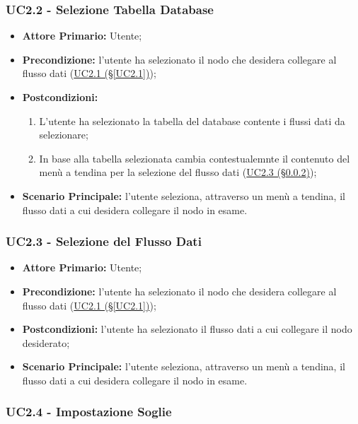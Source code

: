 \subsubsection{UC2.2 - Selezione Tabella Database}\label{UC2.2}
\begin{itemize}
\item \textbf{Attore Primario:} Utente;
\item \textbf{Precondizione:} l'utente ha selezionato il nodo che desidera collegare al flusso dati 					(\hyperref[UC2.1]{UC2.1 (§\ref*{UC2.1})});
\item \textbf{Postcondizioni:}
	\begin{enumerate}
	\item L'utente ha selezionato la tabella del database contente i flussi dati da selezionare;
	\item In base alla tabella selezionata cambia contestualemnte il contenuto del menù a tendina per la selezione del flusso dati (\hyperref[UC2.3]{UC2.3 (§\ref*{UC2.3})});
	\end{enumerate}
\item \textbf{Scenario Principale:} l'utente seleziona, attraverso un menù a tendina, il flusso dati a cui desidera collegare il nodo in esame.
\end{itemize}

\subsubsection{UC2.3 - Selezione del Flusso Dati}\label{UC2.3}
\begin{itemize}
	\item \textbf{Attore Primario:} Utente;
	\item \textbf{Precondizione:} l'utente ha selezionato il nodo che desidera collegare al flusso dati 						(\hyperref[UC2.1]{UC2.1 (§\ref*{UC2.1})});
	\item \textbf{Postcondizioni:} l'utente ha selezionato il flusso dati a cui collegare il nodo desiderato;
	\item \textbf{Scenario Principale:} l'utente seleziona, attraverso un menù a tendina, il flusso dati a cui desidera collegare il nodo in esame.
\end{itemize}

\pagebreak

\subsubsection{UC2.4 - Impostazione Soglie}\label{UC2.4}

